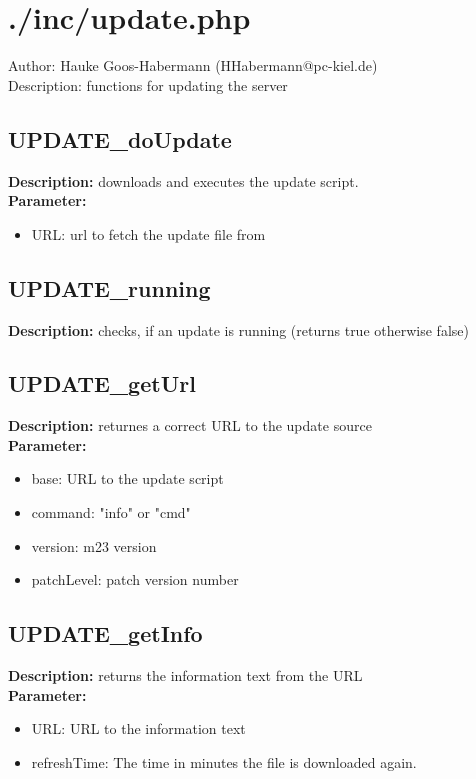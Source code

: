 \newpage\section{./inc/update.php}
 Author: Hauke Goos-Habermann (HHabermann@pc-kiel.de)\\
 Description: functions for updating the server\\

\subsection{UPDATE\_doUpdate}
\textbf{Description:} downloads and executes the update script.\\
\textbf{Parameter:}
\begin{itemize}
\item URL: url to fetch the update file from
\end{itemize}

\subsection{UPDATE\_running}
\textbf{Description:} checks, if an update is running (returns true otherwise false)\\

\subsection{UPDATE\_getUrl}
\textbf{Description:} returnes a correct URL to the update source\\
\textbf{Parameter:}
\begin{itemize}
\item base: URL to the update script
\item command: "info" or "cmd"
\item version: m23 version
\item patchLevel: patch version number
\end{itemize}

\subsection{UPDATE\_getInfo}
\textbf{Description:} returns the information text from the URL\\
\textbf{Parameter:}
\begin{itemize}
\item URL: URL to the information text
\item refreshTime: The time in minutes the file is downloaded again.
\end{itemize}


